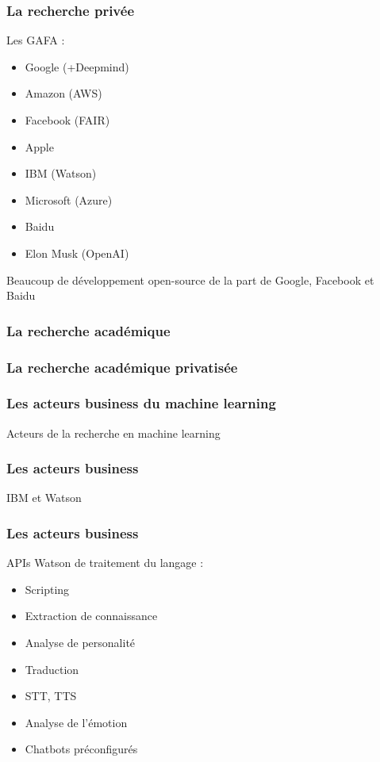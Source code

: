 \begin{frame}
  \frametitle{La recherche privée}
  Les GAFA :
  \begin{itemize}
  \item Google (+Deepmind)
  \item Amazon (AWS)
  \item Facebook (FAIR)
  \item Apple 
  \item IBM (Watson)
  \item Microsoft (Azure)
  \item Baidu
  \item Elon Musk (OpenAI)
  \end{itemize}
  Beaucoup de développement open-source de la part de Google, Facebook et Baidu
\end{frame}

\begin{frame}
  \frametitle{La recherche académique}
\end{frame}

\begin{frame}
  \frametitle{La recherche académique privatisée}
\end{frame}

\begin{frame}
  \frametitle{Les acteurs business du machine learning}
  Acteurs de la recherche en machine learning
\end{frame}

\begin{frame}
  \frametitle{Les acteurs business}
  IBM et Watson
\end{frame}

\begin{frame}
  \frametitle{Les acteurs business}
  APIs Watson de traitement du langage : \\
  \begin{minipage}[c]{0.49\linewidth}
    \begin{itemize}
    \item Scripting
    \item Extraction de connaissance
    \item Analyse de personalité
    \item Traduction
    \end{itemize}
  \end{minipage}\hfill
  \begin{minipage}[c]{0.50\linewidth}
    \begin{itemize}
    \item STT, TTS
    \item Analyse de l'émotion
    \item Chatbots préconfigurés
    \end{itemize}
  \end{minipage}\hfill
\end{frame}

